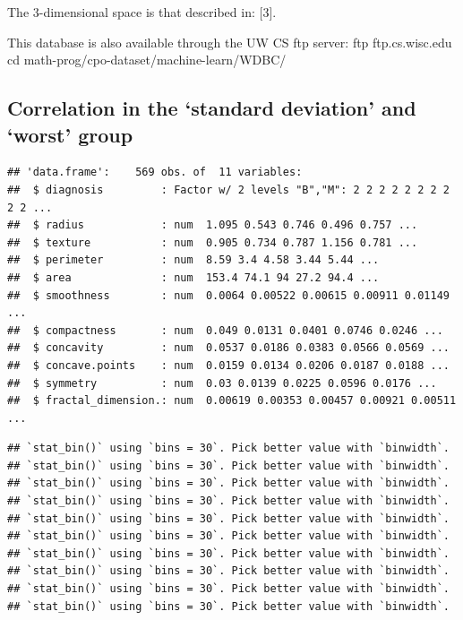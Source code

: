 \documentclass[
  11pt,
]{article}
\begin{document}
The 3-dimensional space is that described in: {[}3{]}.

This database is also available through the UW CS ftp server: ftp
ftp.cs.wisc.edu cd math-prog/cpo-dataset/machine-learn/WDBC/

\hypertarget{correlation-in-the-standard-deviation-and-worst-group}{%
\subsection{Correlation in the `standard deviation' and `worst'
group}\label{correlation-in-the-standard-deviation-and-worst-group}}

\begin{verbatim}
## 'data.frame':    569 obs. of  11 variables:
##  $ diagnosis         : Factor w/ 2 levels "B","M": 2 2 2 2 2 2 2 2 2 2 ...
##  $ radius            : num  1.095 0.543 0.746 0.496 0.757 ...
##  $ texture           : num  0.905 0.734 0.787 1.156 0.781 ...
##  $ perimeter         : num  8.59 3.4 4.58 3.44 5.44 ...
##  $ area              : num  153.4 74.1 94 27.2 94.4 ...
##  $ smoothness        : num  0.0064 0.00522 0.00615 0.00911 0.01149 ...
##  $ compactness       : num  0.049 0.0131 0.0401 0.0746 0.0246 ...
##  $ concavity         : num  0.0537 0.0186 0.0383 0.0566 0.0569 ...
##  $ concave.points    : num  0.0159 0.0134 0.0206 0.0187 0.0188 ...
##  $ symmetry          : num  0.03 0.0139 0.0225 0.0596 0.0176 ...
##  $ fractal_dimension.: num  0.00619 0.00353 0.00457 0.00921 0.00511 ...
\end{verbatim}

\begin{verbatim}
## `stat_bin()` using `bins = 30`. Pick better value with `binwidth`.
## `stat_bin()` using `bins = 30`. Pick better value with `binwidth`.
## `stat_bin()` using `bins = 30`. Pick better value with `binwidth`.
## `stat_bin()` using `bins = 30`. Pick better value with `binwidth`.
## `stat_bin()` using `bins = 30`. Pick better value with `binwidth`.
## `stat_bin()` using `bins = 30`. Pick better value with `binwidth`.
## `stat_bin()` using `bins = 30`. Pick better value with `binwidth`.
## `stat_bin()` using `bins = 30`. Pick better value with `binwidth`.
## `stat_bin()` using `bins = 30`. Pick better value with `binwidth`.
## `stat_bin()` using `bins = 30`. Pick better value with `binwidth`.
\end{verbatim}
\end{document}
